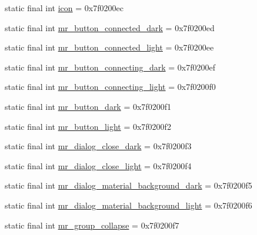 \begin{CompactItemize}
\item 
static final int \hyperlink{classandroid_1_1support_1_1v7_1_1recyclerview_1_1_r_1_1drawable_c44dfac5d878791824575d2c80cb9f68}{icon} = 0x7f0200ec
\item 
static final int \hyperlink{classandroid_1_1support_1_1v7_1_1recyclerview_1_1_r_1_1drawable_dd36a357ec8e9c964f7f524539a6780d}{mr\_\-button\_\-connected\_\-dark} = 0x7f0200ed
\item 
static final int \hyperlink{classandroid_1_1support_1_1v7_1_1recyclerview_1_1_r_1_1drawable_060bfe94235096eb91e9c251bbf22763}{mr\_\-button\_\-connected\_\-light} = 0x7f0200ee
\item 
static final int \hyperlink{classandroid_1_1support_1_1v7_1_1recyclerview_1_1_r_1_1drawable_a30cac73218bc15dd353ee0f54afa766}{mr\_\-button\_\-connecting\_\-dark} = 0x7f0200ef
\item 
static final int \hyperlink{classandroid_1_1support_1_1v7_1_1recyclerview_1_1_r_1_1drawable_016a13c1af800e0e5bf94a2c89819447}{mr\_\-button\_\-connecting\_\-light} = 0x7f0200f0
\item 
static final int \hyperlink{classandroid_1_1support_1_1v7_1_1recyclerview_1_1_r_1_1drawable_4e819e610cce915a7730bb95db612914}{mr\_\-button\_\-dark} = 0x7f0200f1
\item 
static final int \hyperlink{classandroid_1_1support_1_1v7_1_1recyclerview_1_1_r_1_1drawable_d60f55941f31ca332e49bdc879d179ac}{mr\_\-button\_\-light} = 0x7f0200f2
\item 
static final int \hyperlink{classandroid_1_1support_1_1v7_1_1recyclerview_1_1_r_1_1drawable_f4f011e5846da8bc0194798c37271f46}{mr\_\-dialog\_\-close\_\-dark} = 0x7f0200f3
\item 
static final int \hyperlink{classandroid_1_1support_1_1v7_1_1recyclerview_1_1_r_1_1drawable_6ea8dc4edd3c859e6692c16512fe0e48}{mr\_\-dialog\_\-close\_\-light} = 0x7f0200f4
\item 
static final int \hyperlink{classandroid_1_1support_1_1v7_1_1recyclerview_1_1_r_1_1drawable_3b26fe1b215d1e0c7f258a8f3da5ab89}{mr\_\-dialog\_\-material\_\-background\_\-dark} = 0x7f0200f5
\item 
static final int \hyperlink{classandroid_1_1support_1_1v7_1_1recyclerview_1_1_r_1_1drawable_b45dc50fafe380cfe0c1ea4ed961ec01}{mr\_\-dialog\_\-material\_\-background\_\-light} = 0x7f0200f6
\item 
static final int \hyperlink{classandroid_1_1support_1_1v7_1_1recyclerview_1_1_r_1_1drawable_85a4e8ca3a6408cc518ab3cce3802882}{mr\_\-group\_\-collapse} = 0x7f0200f7

\end{CompactItemize}
